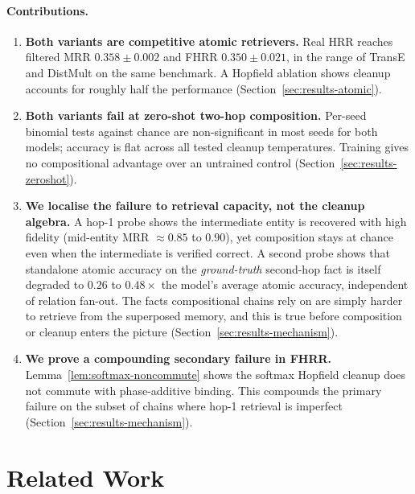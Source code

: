 \documentclass[11pt]{article}
\theoremstyle{definition}
\begin{document}
\paragraph{Contributions.}
\begin{enumerate}[leftmargin=1.4em, itemsep=3pt]
\item \textbf{Both variants are competitive atomic retrievers.}
Real HRR reaches filtered MRR $0.358 \pm 0.002$ and FHRR $0.350 \pm 0.021$,
in the range of TransE and DistMult on the same benchmark. A Hopfield ablation
shows cleanup accounts for roughly half the performance
(Section~\ref{sec:results-atomic}).

\item \textbf{Both variants fail at zero-shot two-hop composition.}
Per-seed binomial tests against chance are non-significant in most seeds for
both models; accuracy is flat across all tested cleanup temperatures. Training
gives no compositional advantage over an untrained control
(Section~\ref{sec:results-zeroshot}).

\item \textbf{We localise the failure to retrieval capacity, not the cleanup algebra.}
A hop-1 probe shows the intermediate entity is recovered with high fidelity
(mid-entity MRR $\approx 0.85$ to $0.90$), yet composition stays at chance even
when the intermediate is verified correct. A second probe shows that standalone
atomic accuracy on the \emph{ground-truth} second-hop fact is itself degraded
to $0.26$ to $0.48\times$ the model's average atomic accuracy, independent of
relation fan-out. The facts compositional chains rely on are simply harder to
retrieve from the superposed memory, and this is true before composition or
cleanup enters the picture (Section~\ref{sec:results-mechanism}).

\item \textbf{We prove a compounding secondary failure in FHRR.}
Lemma~\ref{lem:softmax-noncommute} shows the softmax Hopfield cleanup does not
commute with phase-additive binding. This compounds the primary failure on the
subset of chains where hop-1 retrieval is imperfect
(Section~\ref{sec:results-mechanism}).
\end{enumerate}

\section{Related Work}
\label{sec:related}
\end{document}

